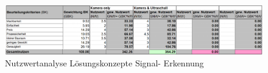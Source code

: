 \documentclass[../../../main.tex]{subfiles}
\begin{document}
    \begin{figure}[H]
        \centering
        \includegraphics[width=1\textwidth]{Nutzwert_Signal.png}
        \caption{Nutzwertanalyse Lösungskonzepte Signal- Erkennung}
        \label{fig:nutzwer_signal}
    \end{figure}
\end{document}
